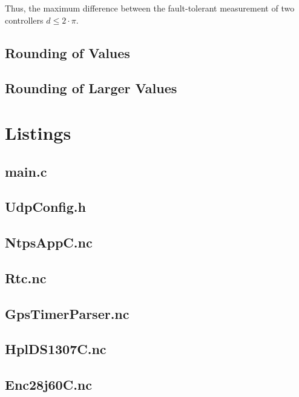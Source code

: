 \documentclass[12pt,a4paper,titlepage,oneside]{article}
\begin{document}
Thus, the maximum difference between the fault-tolerant measurement of two
controllers $d \leq 2 \cdot \pi$.

\subsection{Rounding of Values}
\subsection{Rounding of Larger Values}


\newpage
\appendix
\section{Listings}
\small{

\subsection{main.c}


\subsection{UdpConfig.h}


\subsection{NtpsAppC.nc}


\subsection{Rtc.nc}


\subsection{GpsTimerParser.nc}


\subsection{HplDS1307C.nc}


\subsection{Enc28j60C.nc}


}
\end{document}
